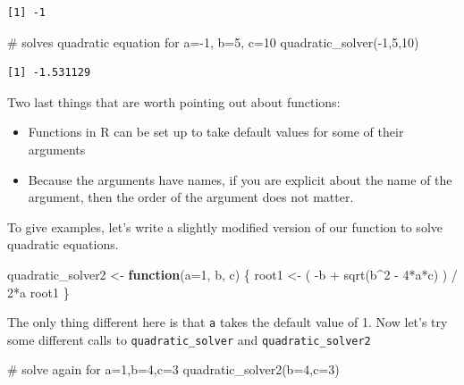 \documentclass[
  letterpaper,
  DIV=11,
  numbers=noendperiod]{scrreprt}
\newenvironment{Shaded}{\begin{snugshade}}{\end{snugshade}}
\newcommand{\AttributeTok}[1]{\textcolor[rgb]{0.40,0.45,0.13}{#1}}
\newcommand{\CommentTok}[1]{\textcolor[rgb]{0.37,0.37,0.37}{#1}}
\newcommand{\ControlFlowTok}[1]{\textcolor[rgb]{0.00,0.23,0.31}{\textbf{#1}}}
\newcommand{\DecValTok}[1]{\textcolor[rgb]{0.68,0.00,0.00}{#1}}
\newcommand{\FunctionTok}[1]{\textcolor[rgb]{0.28,0.35,0.67}{#1}}
\newcommand{\NormalTok}[1]{\textcolor[rgb]{0.00,0.23,0.31}{#1}}
\newcommand{\OtherTok}[1]{\textcolor[rgb]{0.00,0.23,0.31}{#1}}
\newcommand{\SpecialCharTok}[1]{\textcolor[rgb]{0.37,0.37,0.37}{#1}}
\begin{document}
\begin{verbatim}
[1] -1
\end{verbatim}

\begin{Shaded}
\begin{Highlighting}[]
\CommentTok{\# solves quadratic equation for a={-}1, b=5, c=10}
\FunctionTok{quadratic\_solver}\NormalTok{(}\SpecialCharTok{{-}}\DecValTok{1}\NormalTok{,}\DecValTok{5}\NormalTok{,}\DecValTok{10}\NormalTok{)}
\end{Highlighting}
\end{Shaded}

\begin{verbatim}
[1] -1.531129
\end{verbatim}

Two last things that are worth pointing out about functions:

\begin{itemize}
\item
  Functions in R can be set up to take default values for some of their
  arguments
\item
  Because the arguments have names, if you are explicit about the name
  of the argument, then the order of the argument does not matter.
\end{itemize}

To give examples, let's write a slightly modified version of our
function to solve quadratic equations.

\begin{Shaded}
\begin{Highlighting}[]
\NormalTok{quadratic\_solver2 }\OtherTok{\textless{}{-}} \ControlFlowTok{function}\NormalTok{(}\AttributeTok{a=}\DecValTok{1}\NormalTok{, b, c) \{}
\NormalTok{  root1 }\OtherTok{\textless{}{-}}\NormalTok{ ( }\SpecialCharTok{{-}}\NormalTok{b }\SpecialCharTok{+} \FunctionTok{sqrt}\NormalTok{(b}\SpecialCharTok{\^{}}\DecValTok{2} \SpecialCharTok{{-}} \DecValTok{4}\SpecialCharTok{*}\NormalTok{a}\SpecialCharTok{*}\NormalTok{c) ) }\SpecialCharTok{/} \DecValTok{2}\SpecialCharTok{*}\NormalTok{a}
\NormalTok{  root1}
\NormalTok{\}}
\end{Highlighting}
\end{Shaded}

The only thing different here is that \texttt{a} takes the default value
of 1. Now let's try some different calls to \texttt{quadratic\_solver}
and \texttt{quadratic\_solver2}

\begin{Shaded}
\begin{Highlighting}[]
\CommentTok{\# solve again for a=1,b=4,c=3}
\FunctionTok{quadratic\_solver2}\NormalTok{(}\AttributeTok{b=}\DecValTok{4}\NormalTok{,}\AttributeTok{c=}\DecValTok{3}\NormalTok{)}
\end{Highlighting}
\end{Shaded}
\end{document}
